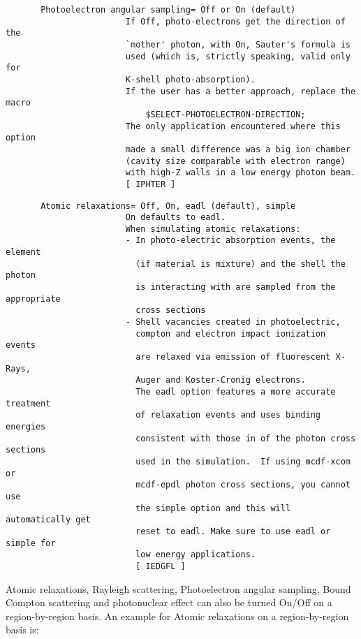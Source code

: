 \begin{verbatim}
       Photoelectron angular sampling= Off or On (default)
                        If Off, photo-electrons get the direction of the
                        `mother' photon, with On, Sauter's formula is
                        used (which is, strictly speaking, valid only for
                        K-shell photo-absorption).
                        If the user has a better approach, replace the macro
                            $SELECT-PHOTOELECTRON-DIRECTION;
                        The only application encountered where this option
                        made a small difference was a big ion chamber
                        (cavity size comparable with electron range)
                        with high-Z walls in a low energy photon beam.
                        [ IPHTER ]
\end{verbatim}
\begin{verbatim}
       Atomic relaxations= Off, On, eadl (default), simple
                        On defaults to eadl.
                        When simulating atomic relaxations:
                        - In photo-electric absorption events, the element
                          (if material is mixture) and the shell the photon
                          is interacting with are sampled from the appropriate
                          cross sections
                        - Shell vacancies created in photoelectric,
                          compton and electron impact ionization events
                          are relaxed via emission of fluorescent X-Rays,
                          Auger and Koster-Cronig electrons.
                          The eadl option features a more accurate treatment
                          of relaxation events and uses binding energies
                          consistent with those in of the photon cross sections
                          used in the simulation.  If using mcdf-xcom or
                          mcdf-epdl photon cross sections, you cannot use
                          the simple option and this will automatically get
                          reset to eadl. Make sure to use eadl or simple for
                          low energy applications.
                          [ IEDGFL ]
\end{verbatim}

\noindent
Atomic relaxations, Rayleigh scattering, Photoelectron angular sampling,
Bound Compton scattering and photonuclear effect
can also be turned On/Off on a region-by-region basis. An example for
Atomic relaxations on a region-by-region basis is:

